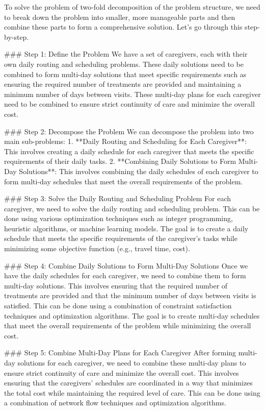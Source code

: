 To solve the problem of two-fold decomposition of the problem structure, we need to break down the problem into smaller, more manageable parts and then combine these parts to form a comprehensive solution. Let's go through this step-by-step.

### Step 1: Define the Problem
We have a set of caregivers, each with their own daily routing and scheduling problems. These daily solutions need to be combined to form multi-day solutions that meet specific requirements such as ensuring the required number of treatments are provided and maintaining a minimum number of days between visits. These multi-day plans for each caregiver need to be combined to ensure strict continuity of care and minimize the overall cost.

### Step 2: Decompose the Problem
We can decompose the problem into two main sub-problems:
1. **Daily Routing and Scheduling for Each Caregiver**: This involves creating a daily schedule for each caregiver that meets the specific requirements of their daily tasks.
2. **Combining Daily Solutions to Form Multi-Day Solutions**: This involves combining the daily schedules of each caregiver to form multi-day schedules that meet the overall requirements of the problem.

### Step 3: Solve the Daily Routing and Scheduling Problem
For each caregiver, we need to solve the daily routing and scheduling problem. This can be done using various optimization techniques such as integer programming, heuristic algorithms, or machine learning models. The goal is to create a daily schedule that meets the specific requirements of the caregiver's tasks while minimizing some objective function (e.g., travel time, cost).

### Step 4: Combine Daily Solutions to Form Multi-Day Solutions
Once we have the daily schedules for each caregiver, we need to combine them to form multi-day solutions. This involves ensuring that the required number of treatments are provided and that the minimum number of days between visits is satisfied. This can be done using a combination of constraint satisfaction techniques and optimization algorithms. The goal is to create multi-day schedules that meet the overall requirements of the problem while minimizing the overall cost.

### Step 5: Combine Multi-Day Plans for Each Caregiver
After forming multi-day solutions for each caregiver, we need to combine these multi-day plans to ensure strict continuity of care and minimize the overall cost. This involves ensuring that the caregivers' schedules are coordinated in a way that minimizes the total cost while maintaining the required level of care. This can be done using a combination of network flow techniques and optimization algorithms.

